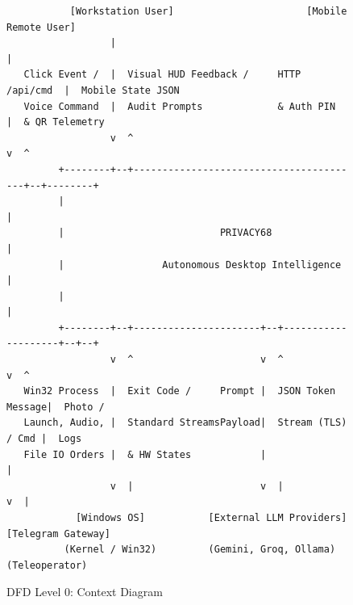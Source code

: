 \begin{figure}[htbp]
\centering
{\scriptsize
\begin{verbatim}
           [Workstation User]                       [Mobile Remote User]
                  |                                           |
   Click Event /  |  Visual HUD Feedback /     HTTP /api/cmd  |  Mobile State JSON
   Voice Command  |  Audit Prompts             & Auth PIN     |  & QR Telemetry
                  v  ^                                        v  ^
         +--------+--+----------------------------------------+--+--------+
         |                                                                |
         |                           PRIVACY68                            |
         |                 Autonomous Desktop Intelligence                |
         |                                                                |
         +--------+--+----------------------+--+--------------------+--+--+
                  v  ^                      v  ^                    v  ^
   Win32 Process  |  Exit Code /     Prompt |  JSON Token    Message|  Photo /
   Launch, Audio, |  Standard StreamsPayload|  Stream (TLS)   / Cmd |  Logs
   File IO Orders |  & HW States            |                       |
                  v  |                      v  |                    v  |
            [Windows OS]           [External LLM Providers]   [Telegram Gateway]
          (Kernel / Win32)         (Gemini, Groq, Ollama)      (Teleoperator)
\end{verbatim}
}
\caption{DFD Level 0: Context Diagram}
\label{fig:dfd_level_0}
\end{figure}

